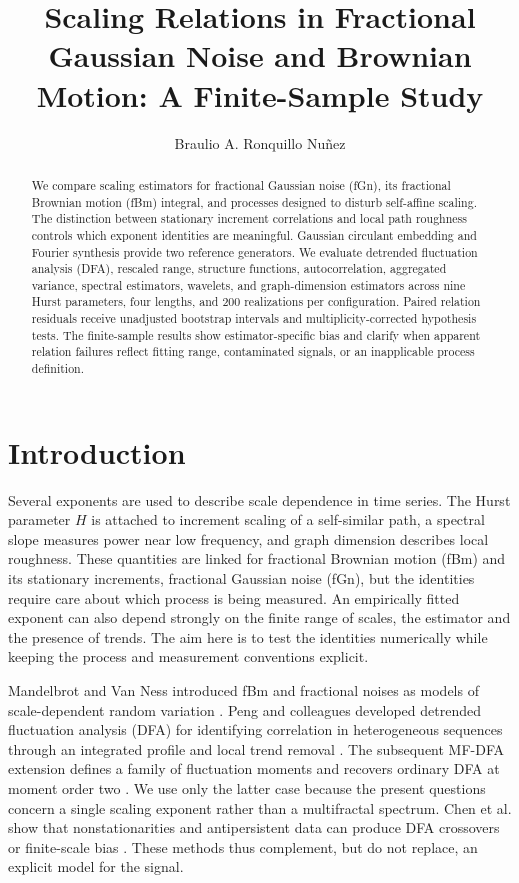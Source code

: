 \documentclass[12pt,twocolumn]{article}
\title{Scaling Relations in Fractional Gaussian Noise and Brownian Motion: A Finite-Sample Study}
\author{Braulio A. Ronquillo Nuñez\\}
\date{}
\begin{document}
\maketitle
\begin{abstract}
We compare scaling estimators for fractional Gaussian noise (fGn), its fractional Brownian motion (fBm) integral, and processes designed to disturb self-affine scaling. The distinction between stationary increment correlations and local path roughness controls which exponent identities are meaningful. Gaussian circulant embedding and Fourier synthesis provide two reference generators. We evaluate detrended fluctuation analysis (DFA), rescaled range, structure functions, autocorrelation, aggregated variance, spectral estimators, wavelets, and graph-dimension estimators across nine Hurst parameters, four lengths, and 200 realizations per configuration. Paired relation residuals receive unadjusted bootstrap intervals and multiplicity-corrected hypothesis tests. The finite-sample results show estimator-specific bias and clarify when apparent relation failures reflect fitting range, contaminated signals, or an inapplicable process definition.


\end{abstract}

\section{Introduction}

Several exponents are used to describe scale dependence in time series. The Hurst parameter $H$ is attached to increment scaling of a self-similar path, a spectral slope measures power near low frequency, and graph dimension describes local roughness. These quantities are linked for fractional Brownian motion (fBm) and its stationary increments, fractional Gaussian noise (fGn), but the identities require care about which process is being measured. An empirically fitted exponent can also depend strongly on the finite range of scales, the estimator and the presence of trends. The aim here is to test the identities numerically while keeping the process and measurement conventions explicit.

Mandelbrot and Van Ness introduced fBm and fractional noises as models of scale-dependent random variation \cite{mandelbrot1968}. Peng and colleagues developed detrended fluctuation analysis (DFA) for identifying correlation in heterogeneous sequences through an integrated profile and local trend removal \cite{peng1994}. The subsequent MF-DFA extension defines a family of fluctuation moments and recovers ordinary DFA at moment order two \cite{kantelhardt2002}. We use only the latter case because the present questions concern a single scaling exponent rather than a multifractal spectrum. Chen et al. show that nonstationarities and antipersistent data can produce DFA crossovers or finite-scale bias \cite{chen2002}. These methods thus complement, but do not replace, an explicit model for the signal.
\end{document}
